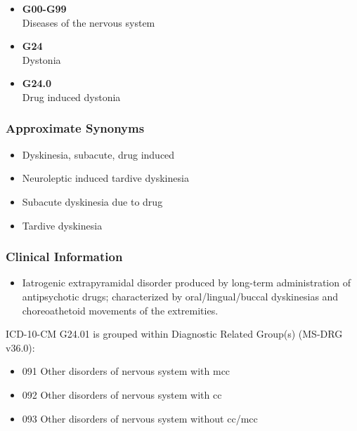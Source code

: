 \begin{paracol}{2}
\begin{leftcolumn}
\begin{itemize}
\tightlist
\item
  \textbf{G00-G99}\\
  Diseases of the nervous system
\item
  \textbf{G24}\\
  Dystonia
\item
  \textbf{G24.0}\\
  Drug induced dystonia
\end{itemize}

\hypertarget{approximate-synonyms-2}{%
\subsubsection{Approximate Synonyms}\label{approximate-synonyms-2}}

\begin{itemize}
\tightlist
\item
  Dyskinesia, subacute, drug induced
\item
  Neuroleptic induced tardive dyskinesia
\item
  Subacute dyskinesia due to drug
\item
  Tardive dyskinesia
\end{itemize}

\hypertarget{clinical-information-1}{%
\subsubsection{Clinical Information}\label{clinical-information-1}}

\begin{itemize}
\tightlist
\item
  Iatrogenic extrapyramidal disorder produced by long-term administration of antipsychotic drugs; characterized by oral/lingual/buccal dyskinesias and choreoathetoid movements of the extremities.
\end{itemize}

\noindent ICD-10-CM G24.01 is grouped within Diagnostic Related Group(s) (MS-DRG v36.0):

\begin{itemize}
\tightlist
\item
  091 Other disorders of nervous system with mcc
\item
  092 Other disorders of nervous system with cc
\item
  093 Other disorders of nervous system without cc/mcc
\end{itemize}
\newpage


\end{leftcolumn}
\end{paracol}
